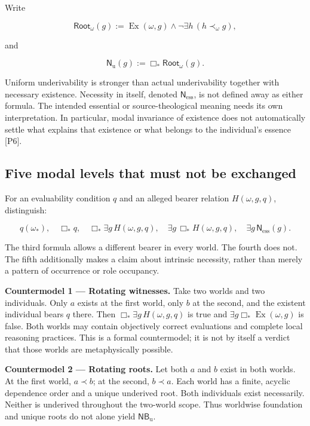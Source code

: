 \documentclass[11pt,a4paper]{article}
\begin{document}
Write

\nopagebreak[4]

\[
\mathsf{Root}_\omega(g)
 :=\operatorname{Ex}(\omega,g)\land
   \neg\exists h\,(h\prec_\omega g),
\]

and

\nopagebreak[4]

\[
\mathsf N_{\mathrm u}(g):=\Box_*\mathsf{Root}_\omega(g).
\]

Uniform underivability is stronger than actual underivability together
with necessary existence. Necessity in itself, denoted
\(\mathsf N_{\mathrm{ess}}\), is not defined away as either formula. The
intended essential or source-theological meaning needs its own
interpretation. In particular, modal invariance of existence does not
automatically settle what explains that existence or what belongs to the
individual's essence {[}P6{]}.

\subsection{Five modal levels that must not be
exchanged}\label{five-modal-levels-that-must-not-be-exchanged}

For an evaluability condition \(q\) and an alleged bearer relation
\(H(\omega,g,q)\), distinguish:

\nopagebreak[4]

\[
q(\omega_*),\quad
\Box_*q,\quad
\Box_*\exists g\,H(\omega,g,q),\quad
\exists g\,\Box_*H(\omega,g,q),\quad
\exists g\,\mathsf N_{\mathrm{ess}}(g).
\]

The third formula allows a different bearer in every world. The fourth
does not. The fifth additionally makes a claim about intrinsic
necessity, rather than merely a pattern of occurrence or role occupancy.

\textbf{Countermodel 1 --- Rotating witnesses.} Take two worlds and two
individuals. Only \(a\) exists at the first world, only \(b\) at the
second, and the existent individual bears \(q\) there. Then
\(\Box_*\exists g\,H(\omega,g,q)\) is true and
\(\exists g\Box_*\operatorname{Ex}(\omega,g)\) is false. Both worlds may
contain objectively correct evaluations and complete local reasoning
practices. This is a formal countermodel; it is not by itself a verdict
that those worlds are metaphysically possible.

\textbf{Countermodel 2 --- Rotating roots.} Let both \(a\) and \(b\)
exist in both worlds. At the first world, \(a\prec b\); at the second,
\(b\prec a\). Each world has a finite, acyclic dependence order and a
unique underived root. Both individuals exist necessarily. Neither is
underived throughout the two-world scope. Thus worldwise foundation and
unique roots do not alone yield \(\mathsf{NB}_{\mathrm u}\).
\end{document}
